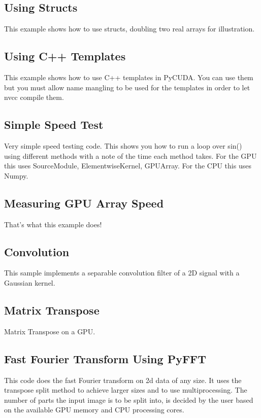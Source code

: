 \documentclass{article}
\begin{document}
\subsection{Using Structs}

This example shows how to use structs, doubling two real arrays for illustration.

\subsection{Using C++ Templates}

This example shows how to use C++ templates in PyCUDA.
You can use them but you must allow 
name mangling to be used for the templates in order to let nvcc 
compile them. 

\subsection{Simple Speed Test}

Very simple speed testing code. This shows you how to run a loop over sin() using different 
methods with a note of the time each method takes. For the GPU this uses SourceModule, 
ElementwiseKernel, GPUArray. For the CPU this uses Numpy.

\subsection{Measuring GPU Array Speed}

That's what this example does!

\subsection{Convolution}

This sample implements a separable convolution filter of a 2D signal with a Gaussian kernel.

\subsection{Matrix Transpose}

Matrix Transpose on a GPU.

\subsection{Fast Fourier Transform Using PyFFT }

This code does the fast Fourier transform on 2d data of any size. 
 It uses the transpose split method to achieve larger sizes and to
 use multiprocessing. The number of parts the input image is to be 
 split into, is decided by the user based on the available GPU memory 
 and CPU processing cores. 
\end{document}
